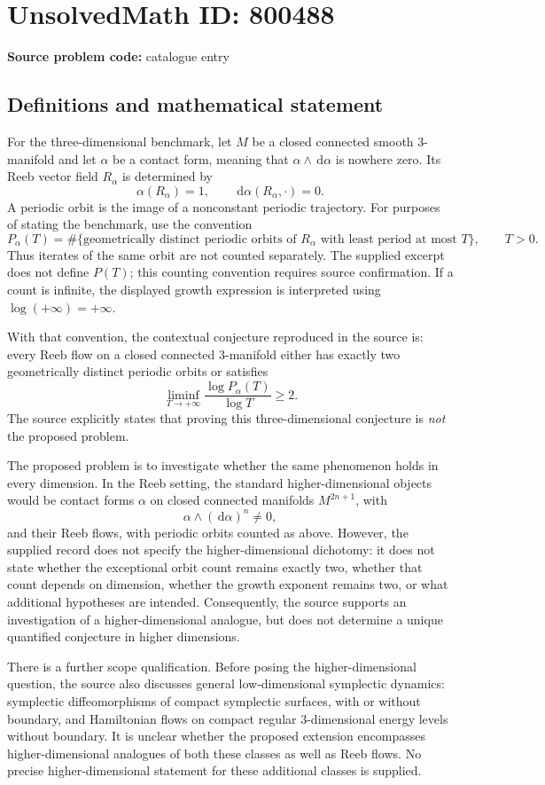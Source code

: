 \documentclass[11pt]{article}
\newcommand{\dd}{\,\mathrm{d}}
\begin{document}
\section*{UnsolvedMath ID: 800488}
\textbf{Source problem code:} catalogue entry
\subsection{Definitions and mathematical statement}
For the three-dimensional benchmark, let \(M\) be a closed connected smooth \(3\)-manifold and let \(\alpha\) be a contact form, meaning that \(\alpha\wedge\dd\alpha\) is nowhere zero. Its Reeb vector field \(R_\alpha\) is determined by
\[
\alpha(R_\alpha)=1,\qquad \dd\alpha(R_\alpha,\cdot)=0.
\]
A periodic orbit is the image of a nonconstant periodic trajectory. For purposes of stating the benchmark, use the convention
\[
P_\alpha(T)=\#\{\text{geometrically distinct periodic orbits of }R_\alpha\text{ with least period at most }T\},\qquad T>0.
\]
Thus iterates of the same orbit are not counted separately. The supplied excerpt does not define \(P(T)\); this counting convention requires source confirmation. If a count is infinite, the displayed growth expression is interpreted using \(\log(+\infty)=+\infty\).

With that convention, the contextual conjecture reproduced in the source is: every Reeb flow on a closed connected \(3\)-manifold either has exactly two geometrically distinct periodic orbits or satisfies
\[
\liminf_{T\to+\infty}\frac{\log P_\alpha(T)}{\log T}\geq 2.
\]
The source explicitly states that proving this three-dimensional conjecture is \emph{not} the proposed problem.

The proposed problem is to investigate whether the same phenomenon holds in every dimension. In the Reeb setting, the standard higher-dimensional objects would be contact forms \(\alpha\) on closed connected manifolds \(M^{2n+1}\), with
\[
\alpha\wedge(\dd\alpha)^n\neq0,
\]
and their Reeb flows, with periodic orbits counted as above. However, the supplied record does not specify the higher-dimensional dichotomy: it does not state whether the exceptional orbit count remains exactly two, whether that count depends on dimension, whether the growth exponent remains two, or what additional hypotheses are intended. Consequently, the source supports an investigation of a higher-dimensional analogue, but does not determine a unique quantified conjecture in higher dimensions.

There is a further scope qualification. Before posing the higher-dimensional question, the source also discusses general low-dimensional symplectic dynamics: symplectic diffeomorphisms of compact symplectic surfaces, with or without boundary, and Hamiltonian flows on compact regular \(3\)-dimensional energy levels without boundary. It is unclear whether the proposed extension encompasses higher-dimensional analogues of both these classes as well as Reeb flows. No precise higher-dimensional statement for these additional classes is supplied.
\end{document}
